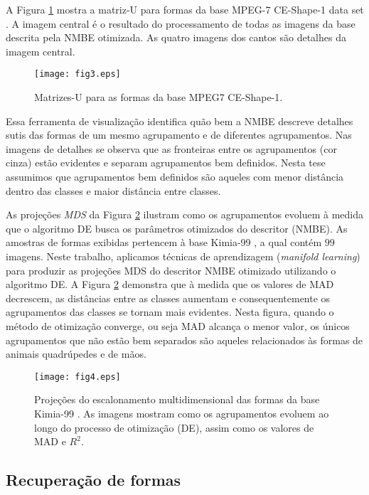 A Figura \ref{fig:projkimia99} mostra a matriz-U para formas da base MPEG-7 CE-Shape-1 data set \cite{855850}. A imagem central é o resultado do processamento de todas as imagens da base descrita pela \ac{NMBE} otimizada. As quatro imagens dos cantos são detalhes da imagem central. 

\begin{figure}[h]
\caption{\label{fig:projkimia99} Matrizes-U para as formas da base MPEG7 CE-Shape-1.}
\centering
\texttt{[image: fig3.eps]}
\end{figure}

Essa ferramenta de visualização identifica quão bem a \ac{NMBE} descreve detalhes sutis das formas de um mesmo agrupamento e de diferentes agrupamentos. Nas imagens de detalhes se observa que as fronteiras entre os agrupamentos (cor cinza) estão evidentes e separam agrupamentos bem definidos. Nesta tese assumimos que agrupamentos bem definidos são aqueles com menor distância dentro das classes e maior distância entre classes.  

As projeções \textit{\ac{MDS}} da Figura \ref{fig:optimization_result} ilustram como os agrupamentos evoluem à medida que o algoritmo \ac{DE} busca os parâmetros otimizados do descritor (\ac{NMBE}). As amostras de formas exibidas pertencem à base Kimia-99 \cite{Sebastian:2004}, a qual contém $99$ imagens. Neste trabalho, aplicamos técnicas de aprendizagem (\textit{manifold learning}) para produzir as projeções \ac{MDS} do descritor \ac{NMBE} otimizado utilizando o algoritmo \ac{DE}.  A Figura \ref{fig:optimization_result} demonstra que à medida que os valores de \ac{MAD} decrescem, as distâncias entre as classes aumentam e consequentemente os agrupamentos das classes se tornam mais evidentes. Nesta figura, quando o método de otimização converge, ou seja \ac{MAD} alcança o menor valor,   os únicos agrupamentos que não estão bem separados são aqueles relacionados às formas de animais quadrúpedes e de mãos.

\begin{figure}[h]
\caption{\label{fig:optimization_result} Projeções do escalonamento multidimensional das formas da base Kimia-99 . As imagens mostram como os agrupamentos evoluem ao longo do processo de otimização (\ac{DE}), assim como os valores de \ac{MAD} e $R^2$.}
\centering
\texttt{[image: fig4.eps]}
\end{figure}

\subsection{Recuperação de formas}

